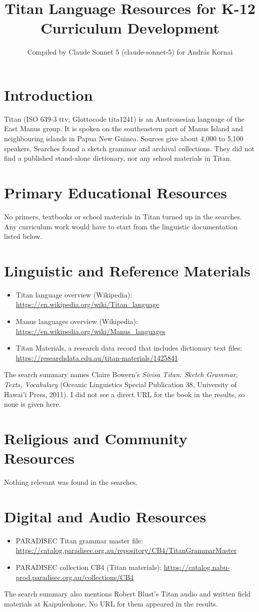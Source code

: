 \documentclass[12pt]{article}
\title{Titan Language Resources for K-12 Curriculum Development}
\author{Compiled by Claude Sonnet 5 (claude-sonnet-5) for Andr\'as Kornai}
\date{}
\begin{document}
\maketitle

\section{Introduction}
Titan (ISO 639-3 ttv; Glottocode tita1241) is an Austronesian language of the East Manus group. It is spoken on the southeastern part of Manus Island and neighbouring islands in Papua New Guinea. Sources give about 4,000 to 5,100 speakers. Searches found a sketch grammar and archival collections. They did not find a published stand-alone dictionary, nor any school materials in Titan.

\section{Primary Educational Resources}
No primers, textbooks or school materials in Titan turned up in the searches. Any curriculum work would have to start from the linguistic documentation listed below.

\section{Linguistic and Reference Materials}
\begin{itemize}
\item Titan language overview (Wikipedia): \url{https://en.wikipedia.org/wiki/Titan_language}
\item Manus languages overview (Wikipedia): \url{https://en.wikipedia.org/wiki/Manus_languages}
\item Titan Materials, a research data record that includes dictionary text files: \url{https://researchdata.edu.au/titan-materials/1425841}
\end{itemize}
The search summary names Claire Bowern's \emph{Sivisa Titan: Sketch Grammar, Texts, Vocabulary} (Oceanic Linguistics Special Publication 38, University of Hawai'i Press, 2011). I did not see a direct URL for the book in the results, so none is given here.

\section{Religious and Community Resources}
Nothing relevant was found in the searches.

\section{Digital and Audio Resources}
\begin{itemize}
\item PARADISEC Titan grammar master file: \url{https://catalog.paradisec.org.au/repository/CB4/TitanGrammarMaster}
\item PARADISEC collection CB4 (Titan materials): \url{https://catalog.nabu-prod.paradisec.org.au/collections/CB4}
\end{itemize}
The search summary also mentions Robert Blust's Titan audio and written field materials at Kaipuleohone. No URL for them appeared in the results.
\end{document}
